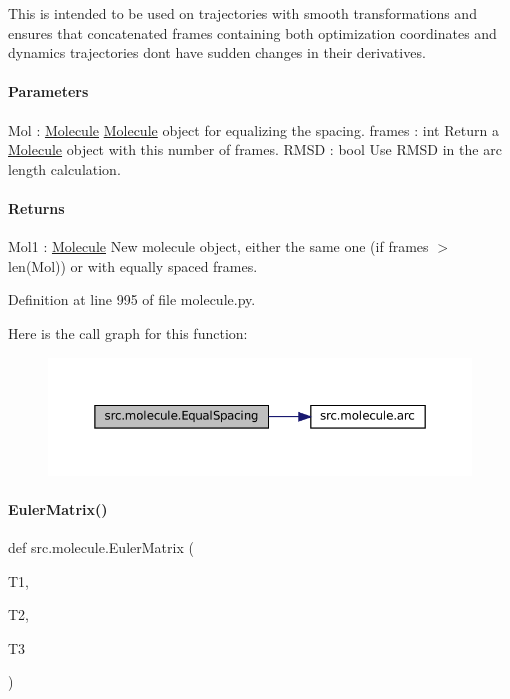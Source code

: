 This is intended to be used on trajectories with smooth transformations and ensures that concatenated frames containing both optimization coordinates and dynamics trajectories don\textquotesingle{}t have sudden changes in their derivatives.

\paragraph*{Parameters }

Mol \+: \hyperlink{classsrc_1_1molecule_1_1Molecule}{Molecule} \hyperlink{classsrc_1_1molecule_1_1Molecule}{Molecule} object for equalizing the spacing. frames \+: int Return a \hyperlink{classsrc_1_1molecule_1_1Molecule}{Molecule} object with this number of frames. R\+M\+SD \+: bool Use R\+M\+SD in the arc length calculation.

\paragraph*{Returns }

Mol1 \+: \hyperlink{classsrc_1_1molecule_1_1Molecule}{Molecule} New molecule object, either the same one (if frames $>$ len(\+Mol)) or with equally spaced frames. 

Definition at line 995 of file molecule.\+py.

Here is the call graph for this function\+:
\nopagebreak
\begin{figure}[H]
\begin{center}
\leavevmode
\includegraphics[width=350pt]{namespacesrc_1_1molecule_af77e6cac48816736aa9a5cfa2f74071b_cgraph}
\end{center}
\end{figure}
\mbox{\label{namespacesrc_1_1molecule_a0b808b0181dfa0aed5879c61f683ec1a}} 
\paragraph{\texorpdfstring{Euler\+Matrix()}{EulerMatrix()}}
{\footnotesize\ttfamily def src.\+molecule.\+Euler\+Matrix (\begin{DoxyParamCaption}\item[{}]{T1,  }\item[{}]{T2,  }\item[{}]{T3 }\end{DoxyParamCaption})}



